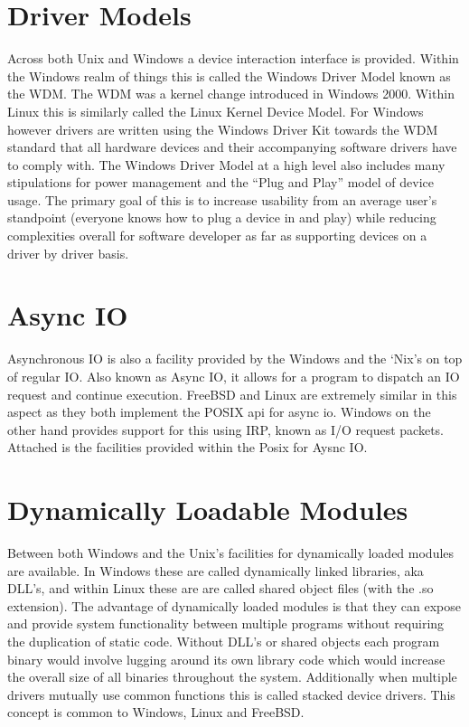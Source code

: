 \documentclass[letterpaper,10pt,draftclsnofoot,onecolumn]{IEEEtran}
\begin{document}
\section{Driver Models}
Across both Unix and Windows a device interaction interface is provided. Within the Windows realm of things this is called the Windows Driver Model known as the WDM. The WDM was a kernel change introduced in Windows 2000. Within Linux this is similarly called the Linux Kernel Device Model. For Windows however drivers are written using the Windows Driver Kit towards the WDM standard that all hardware devices and their accompanying software drivers have to comply with. The Windows Driver Model at a high level also includes many stipulations for power management and the “Plug and Play” model of device usage. \cite{russinovich} The primary goal of this is to increase usability from an average user’s standpoint (everyone knows how to plug a device in and play) while reducing complexities overall for software developer as far as supporting devices on a driver by driver basis.\\
\section{Async IO}
Asynchronous IO is also a facility provided by the Windows and the ‘Nix’s on top of regular IO. Also known as Async IO, it allows for a program to dispatch an IO request and continue execution. FreeBSD and Linux are extremely similar in this aspect as they both implement the POSIX api for async io. Windows on the other hand provides support for this using IRP, known as I/O request packets. Attached is the facilities provided within the Posix for Aysnc IO.\\

\section{Dynamically Loadable Modules}
Between both Windows and the Unix’s facilities for dynamically loaded modules are available. In Windows these are called dynamically linked libraries, aka DLL’s, and within Linux these are are called shared object files (with the .so extension). The advantage of dynamically loaded modules is that they can expose and provide system functionality between multiple programs without requiring the duplication of static code. Without DLL’s or shared objects each program binary would involve lugging around its own library code which would increase the overall size of all binaries throughout the system. Additionally when multiple drivers mutually use common functions this is called stacked device drivers. This concept is common to Windows, Linux and FreeBSD.\\
\end{document}
